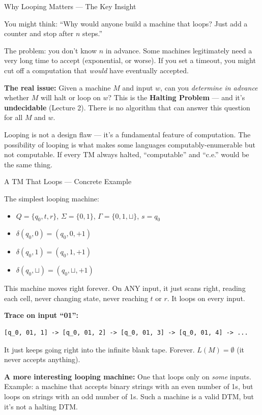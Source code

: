 \documentclass[11pt,a4paper]{article}
\newcommand{\kt}[1]{\par\vspace{0.3em}\colorbox{yellow!60}{\parbox{\dimexpr\linewidth-2\fboxsep}{#1}}\vspace{0.3em}}
\begin{document}
\begin{conceptbox}{Why Looping Matters --- The Key Insight}

You might think: ``Why would anyone build a machine that loops? Just add a counter and stop after $n$ steps.''

The problem: you don't know $n$ in advance. Some machines legitimately need a very long time to accept (exponential, or worse). If you set a timeout, you might cut off a computation that \textit{would} have eventually accepted.

\textbf{The real issue:} Given a machine $M$ and input $w$, can you \textit{determine in advance} whether $M$ will halt or loop on $w$? This is the \textbf{Halting Problem} --- and it's \textbf{undecidable} (Lecture 2). There is no algorithm that can answer this question for all $M$ and $w$.

\kt{Looping is not a design flaw --- it's a fundamental feature of computation. The possibility of looping is what makes some languages computably-enumerable but not computable. If every TM always halted, ``computable'' and ``c.e.'' would be the same thing.}
\end{conceptbox}

\begin{examplebox}{A TM That Loops --- Concrete Example}

The simplest looping machine:
\begin{itemize}[nosep]
\item $Q = \{q_0, t, r\}$, $\Sigma = \{0, 1\}$, $\Gamma = \{0, 1, \sqcup\}$, $s = q_0$
\item $\delta(q_0, 0) = (q_0, 0, +1)$
\item $\delta(q_0, 1) = (q_0, 1, +1)$
\item $\delta(q_0, \sqcup) = (q_0, \sqcup, +1)$
\end{itemize}

This machine moves right forever. On ANY input, it just scans right, reading each cell, never changing state, never reaching $t$ or $r$. It loops on every input.

\textbf{Trace on input ``01'':}
\begin{lstlisting}
[q_0, 01, 1] -> [q_0, 01, 2] -> [q_0, 01, 3] -> [q_0, 01, 4] -> ...
\end{lstlisting}
It just keeps going right into the infinite blank tape. Forever. $L(M) = \emptyset$ (it never accepts anything).

\textbf{A more interesting looping machine:} One that loops only on \textit{some} inputs. Example: a machine that accepts binary strings with an even number of 1s, but loops on strings with an odd number of 1s. Such a machine is a valid DTM, but it's not a halting DTM.
\end{examplebox}
\end{document}
